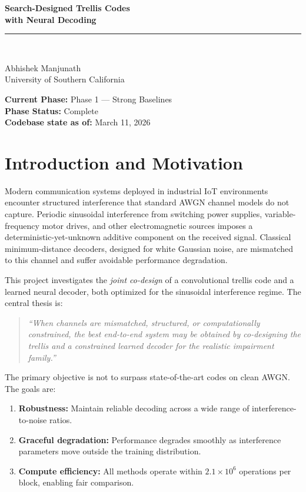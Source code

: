\documentclass[11pt,a4paper]{article}
\begin{document}
\begin{titlepage}
\centering
\vspace*{2cm}
{\LARGE\bfseries Search-Designed Trellis Codes\\[0.4em] with Neural Decoding\par}
\vspace{1.5cm}
\rule{0.6\textwidth}{0.4pt}\\[0.8cm]
{\large Abhishek Manjunath\\[0.2em]
University of Southern California\par}
\vfill
{\normalsize
\textbf{Current Phase:} Phase 1 --- Strong Baselines\\[0.3em]
\textbf{Phase Status:} Complete\\[0.3em]
\textbf{Codebase state as of:} March 11, 2026}
\end{titlepage}

\newpage
\tableofcontents
\newpage

\section{Introduction and Motivation}

Modern communication systems deployed in industrial IoT environments encounter structured interference that standard AWGN channel models do not capture. Periodic sinusoidal interference from switching power supplies, variable-frequency motor drives, and other electromagnetic sources imposes a deterministic-yet-unknown additive component on the received signal. Classical minimum-distance decoders, designed for white Gaussian noise, are mismatched to this channel and suffer avoidable performance degradation.

This project investigates the \emph{joint co-design} of a convolutional trellis code and a learned neural decoder, both optimized for the sinusoidal interference regime. The central thesis is:

\begin{quote}
\itshape
``When channels are mismatched, structured, or computationally constrained,
the best end-to-end system may be obtained by co-designing the trellis and
a constrained learned decoder for the realistic impairment family.''
\end{quote}

The primary objective is not to surpass state-of-the-art codes on clean AWGN. The goals are:
\begin{enumerate}
  \item \textbf{Robustness:} Maintain reliable decoding across a wide range of interference-to-noise ratios.
  \item \textbf{Graceful degradation:} Performance degrades smoothly as interference parameters move outside the training distribution.
  \item \textbf{Compute efficiency:} All methods operate within $2.1 \times 10^6$ operations per block, enabling fair comparison.
\end{enumerate}
\end{document}
